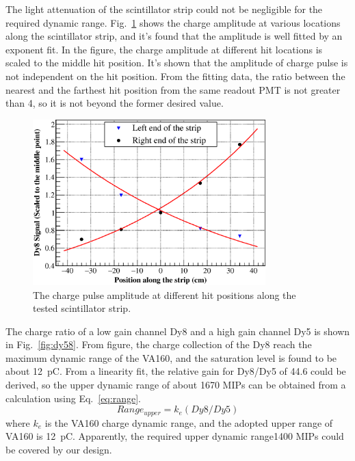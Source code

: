 \documentclass[5p, times]{elsarticle}
\begin{document}
The light attenuation of the scintillator strip could not be negligible for the required dynamic range. 
Fig.~\ref{fig:attenuation} shows the charge amplitude at various locations along the scintillator strip, and it’s found that the amplitude is well fitted by an exponent fit. 
In the figure, the charge amplitude at different hit locations is scaled to the middle hit position. 
It’s shown that the amplitude of charge pulse is not independent on the hit position. 
From the fitting data, the ratio between the nearest and the farthest hit position from the same readout PMT is not greater than 4, so it is not beyond the former desired value.

\begin{figure}
 \centering
 \includegraphics[width=90mm]{attenuation}
\caption{The charge pulse amplitude at different hit positions along the tested scintillator strip.}
\label{fig:attenuation}
\end{figure} 

The charge ratio of a low gain channel Dy8 and a high gain channel Dy5 is shown in Fig.~\ref{fig:dy58}. 
From figure, the charge collection of the Dy8 reach the maximum dynamic range of the VA160, and the saturation level is found to be about \SI{12}{\pico\coulomb}. 
From a linearity fit, the relative gain for Dy8/Dy5 of 44.6 could be derived, so the upper dynamic range of about 1670 MIPs can be obtained from a calculation using Eq.~\ref{eq:range}.
\begin{equation}
 Range_{upper} = k_{e}(Dy8/Dy5)
 \label{eq:range}
\end{equation} 
where $k_e$ is the VA160 charge dynamic range, and the adopted upper range of VA160 is \SI{12}{\pico\coulomb}.
Apparently, the required upper dynamic range1400 MIPs could be covered by our design.
\end{document}
